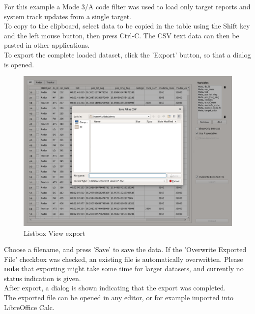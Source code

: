 For this example a Mode 3/A code filter was used to load only target reports and system track updates from a single target. \\

To copy to the clipboard, select data to be copied in the table using the Shift key and the left mouse button, then press Ctrl-C. The CSV text data can then be pasted in other applications. \\

To export the complete loaded dataset, click the 'Export' button, so that a dialog is opened.

\begin{figure}[H]
    \hspace*{-2cm}
    \includegraphics[width=18cm,frame]{figures/listbox_export.png}
  \caption{Listbox View export}
\end{figure}

Choose a filename, and press 'Save' to save the data. If the 'Overwrite Exported File' checkbox was checked, an existing file is automatically overwritten. Please \textbf{note} that exporting might take some time for larger datasets, and currently no status indication is given.\\

After export, a dialog is shown indicating that the export was completed. \\

The exported file can be opened in any editor, or for example imported into LibreOffice Calc.

